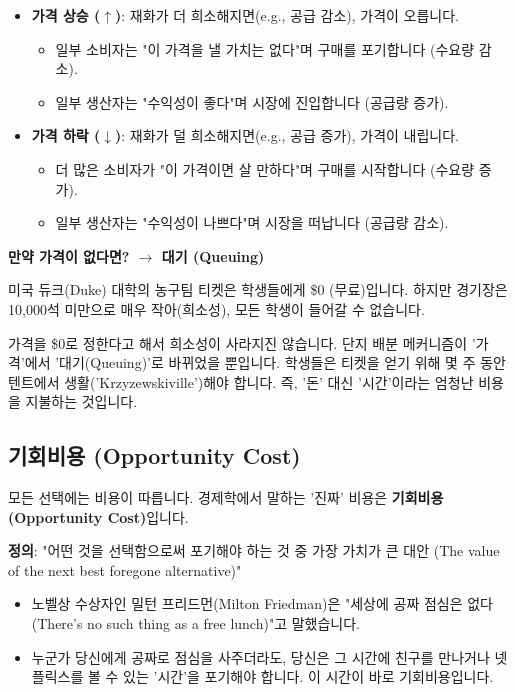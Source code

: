 \documentclass[11pt,a4paper]{book}
\theoremstyle{definition}
\begin{document}
\begin{itemize}
    \item \textbf{가격 상승 ($\uparrow$)}: 재화가 더 희소해지면(e.g., 공급 감소), 가격이 오릅니다.
        \begin{itemize}
            \item 일부 소비자는 "이 가격을 낼 가치는 없다"며 구매를 포기합니다 (수요량 감소).
            \item 일부 생산자는 "수익성이 좋다"며 시장에 진입합니다 (공급량 증가).
        \end{itemize}
    \item \textbf{가격 하락 ($\downarrow$)}: 재화가 덜 희소해지면(e.g., 공급 증가), 가격이 내립니다.
        \begin{itemize}
            \item 더 많은 소비자가 "이 가격이면 살 만하다"며 구매를 시작합니다 (수요량 증가).
            \item 일부 생산자는 "수익성이 나쁘다"며 시장을 떠납니다 (공급량 감소).
        \end{itemize}
\end{itemize}

\begin{warningbox}
\textbf{만약 가격이 없다면? $\rightarrow$ 대기 (Queuing)}

미국 듀크(Duke) 대학의 농구팀 티켓은 학생들에게 \$0 (무료)입니다.
    하지만 경기장은 10,000석 미만으로 매우 작아(희소성), 모든 학생이 들어갈 수 없습니다.

    가격을 \$0로 정한다고 해서 희소성이 사라지진 않습니다.
    단지 배분 메커니즘이 '가격'에서 '대기(Queuing)'로 바뀌었을 뿐입니다. 학생들은 티켓을 얻기 위해 몇 주 동안 텐트에서 생활('Krzyzewskiville')해야 합니다.
    즉, '돈' 대신 '시간'이라는 엄청난 비용을 지불하는 것입니다.
\end{warningbox}

\subsection{기회비용 (Opportunity Cost)}

모든 선택에는 비용이 따릅니다. 경제학에서 말하는 '진짜' 비용은 \textbf{기회비용(Opportunity Cost)}입니다.

\textbf{정의}: "어떤 것을 선택함으로써 포기해야 하는 것 중 가장 가치가 큰 대안 (The value of the next best foregone alternative)"

\begin{itemize}
    \item 노벨상 수상자인 밀턴 프리드먼(Milton Friedman)은 "세상에 공짜 점심은 없다(There's no such thing as a free lunch)"고 말했습니다.
    \item 누군가 당신에게 공짜로 점심을 사주더라도, 당신은 그 시간에 친구를 만나거나 넷플릭스를 볼 수 있는 '시간'을 포기해야 합니다. 이 시간이 바로 기회비용입니다.
\end{itemize}
\end{document}
